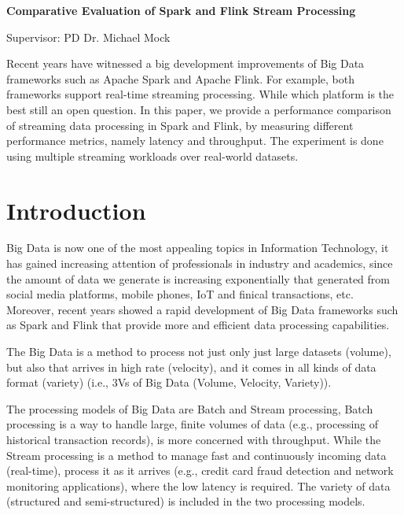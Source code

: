 \documentclass[]{article}
\begin{document}
\begin{flushleft}
\centering\LARGE {\bf Comparative Evaluation of Spark and Flink Stream Processing}

Supervisor: PD Dr. Michael Mock
\thispagestyle{empty}
\end{flushleft}
\newpage
\tableofcontents

\newpage


\begin{abstract}

\end{abstract}
Recent years have witnessed a big development improvements of Big Data frameworks such as Apache Spark and Apache Flink. For example, both frameworks support real-time
streaming processing. While which platform is the best still an open question. 
In this paper, we provide a performance comparison of streaming data processing in Spark and Flink, by measuring different performance metrics, namely latency and throughput. The experiment is done using multiple streaming workloads over real-world datasets.
\section{Introduction}

\par Big Data is now one of the most appealing topics in Information Technology, it has gained increasing attention of professionals in industry and academics, since the amount of data we generate is increasing exponentially \cite{idc} that generated from social media platforms, mobile phones, IoT and finical transactions, etc. Moreover, recent years showed a rapid development of Big Data frameworks such as Spark and Flink that provide more and efficient data processing capabilities.
 \par The Big Data is a method to process not just only just large datasets (volume), but also that arrives in high rate (velocity), and it comes in all kinds of data format (variety) (i.e., 3Vs of Big Data (Volume, Velocity, Variety))\cite{svs}.

\par The processing models of Big Data are Batch and Stream processing, Batch processing is a way to handle large, finite volumes of data (e.g., processing of historical transaction records), is more concerned with throughput. While the Stream processing  is a method to manage fast and continuously incoming data (real-time), process it as it arrives (e.g., credit card fraud detection and network monitoring applications), where the low latency is required. The variety of data (structured and semi-structured) is included in the two processing models.
\end{document}
